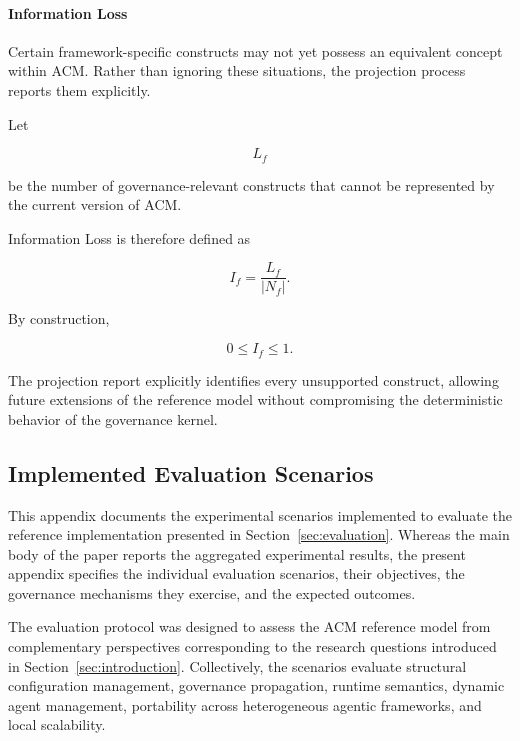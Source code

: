 \documentclass[10pt]{article}
\begin{document}
\paragraph{Information Loss}

Certain framework-specific constructs may not yet possess an equivalent concept
within ACM. Rather than ignoring these situations, the projection process
reports them explicitly.

Let

\[
L_f
\]

be the number of governance-relevant constructs that cannot be represented by
the current version of ACM.

Information Loss is therefore defined as

\begin{equation}
	I_f =
	\frac{L_f}
	{|N_f|}.
	\label{eq:information_loss}
\end{equation}

By construction,

\[
0 \le I_f \le 1.
\]

The projection report explicitly identifies every unsupported construct,
allowing future extensions of the reference model without compromising the
deterministic behavior of the governance kernel.







\subsection{Implemented Evaluation Scenarios}
\label{appendix:evaluation_scenarios}

This appendix documents the experimental scenarios implemented to evaluate the
reference implementation presented in Section~\ref{sec:evaluation}. Whereas the
main body of the paper reports the aggregated experimental results, the present
appendix specifies the individual evaluation scenarios, their objectives, the
governance mechanisms they exercise, and the expected outcomes.

The evaluation protocol was designed to assess the ACM reference model from
complementary perspectives corresponding to the research questions introduced in
Section~\ref{sec:introduction}. Collectively, the scenarios evaluate structural
configuration management, governance propagation, runtime semantics, dynamic
agent management, portability across heterogeneous agentic frameworks, and
local scalability.
\end{document}
